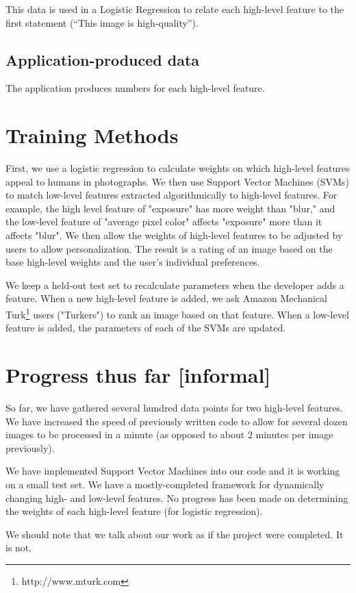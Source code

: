 \documentclass[10pt,twocolumn]{article}
\begin{document}
This data is used in a Logistic Regression to relate each high-level feature to the first statement (``This image is high-quality'').

\subsection{Application-produced data}
The application produces numbers for each high-level feature.

\section{Training Methods}
\label{methods}

First, we use a logistic regression to calculate weights on which high-level features appeal to humans in photographs. We then use Support Vector Machines (SVMs) to match low-level features extracted algorithmically to high-level features. For example, the high level feature of "exposure" has more weight than "blur," and the low-level feature of "average pixel color" affects "exposure" more than it affects "blur". We then allow the weights of high-level features to be adjusted by users to allow personalization. The result is a rating of an image based on the base high-level weights and the user's individual preferences.

We keep a held-out test set to recalculate parameters when the developer adds a feature. When a new high-level feature is added, we ask Amazon Mechanical Turk\footnote{http://www.mturk.com} users ("Turkers") to rank an image based on that feature. When a low-level feature is added, the parameters of each of the SVMs are updated.


\section{Progress thus far [informal]}
So far, we have gathered several hundred data points for two high-level features. We have increased the speed of previously written code to allow for several dozen images to be processed in a minute (as opposed to about 2 minutes per image previously).

We have implemented Support Vector Machines into our code and it is working on a small test set. We have a mostly-completed framework for dynamically changing high- and low-level features. No progress has been made on determining the weights of each high-level feature (for logistic regression).

We should note that we talk about our work as if the project were completed. It is not.
\end{document}
